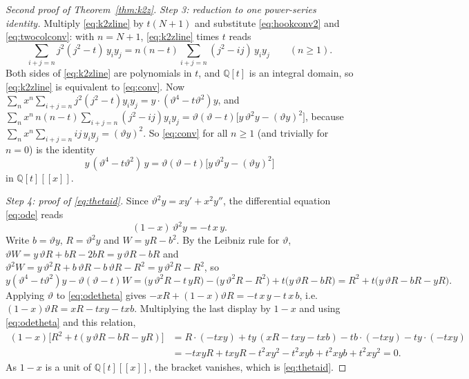 \documentclass[11pt]{article}
\theoremstyle{definition}
\theoremstyle{remark}
\begin{document}
\begin{proof}[Second proof of Theorem~\ref{thm:k2z}]
\emph{Step 3: reduction to one power-series identity.} Multiply \eqref{eq:k2zline} by $t(N+1)$ and substitute \eqref{eq:hookconv2} and \eqref{eq:twocolconv}: with $n=N+1$, \eqref{eq:k2zline} times $t$ reads
\begin{equation}\label{eq:conv}
\sum_{i+j=n}j^2(j^2-t)\,y_iy_j=n(n-t)\sum_{i+j=n}(j^2-ij)\,y_iy_j\qquad(n\ge1).
\end{equation}
Both sides of \eqref{eq:k2zline} are polynomials in $t$, and $\mathbb Q[t]$ is an integral domain, so \eqref{eq:k2zline} is equivalent to \eqref{eq:conv}. Now $\sum_nx^n\sum_{i+j=n}j^2(j^2-t)y_iy_j=y\cdot(\vartheta^4-t\vartheta^2)y$, and $\sum_nx^n\,n(n-t)\sum_{i+j=n}(j^2-ij)y_iy_j=\vartheta(\vartheta-t)\bigl[y\,\vartheta^2y-(\vartheta y)^2\bigr]$, because $\sum_nx^n\sum_{i+j=n}ij\,y_iy_j=(\vartheta y)^2$. So \eqref{eq:conv} for all $n\ge1$ (and trivially for $n=0$) is the identity
\begin{equation}\label{eq:thetaid}
y\,(\vartheta^4-t\vartheta^2)\,y=\vartheta(\vartheta-t)\bigl[y\,\vartheta^2y-(\vartheta y)^2\bigr]
\end{equation}
in $\mathbb Q[t][[x]]$.

\emph{Step 4: proof of \eqref{eq:thetaid}.} Since $\vartheta^2y=xy'+x^2y''$, the differential equation \eqref{eq:ode} reads
\begin{equation}\label{eq:odetheta}
(1-x)\,\vartheta^2y=-t\,x\,y .
\end{equation}
Write $b=\vartheta y$, $R=\vartheta^2y$ and $W=yR-b^2$. By the Leibniz rule for $\vartheta$, $\vartheta W=y\,\vartheta R+bR-2bR=y\,\vartheta R-bR$ and $\vartheta^2W=y\,\vartheta^2R+b\,\vartheta R-b\,\vartheta R-R^2=y\,\vartheta^2R-R^2$, so
\[
y(\vartheta^4-t\vartheta^2)y-\vartheta(\vartheta-t)W=\bigl(y\,\vartheta^2R-t\,yR\bigr)-\bigl(y\,\vartheta^2R-R^2\bigr)+t\bigl(y\,\vartheta R-bR\bigr)
=R^2+t\bigl(y\,\vartheta R-bR-yR\bigr).
\]
Applying $\vartheta$ to \eqref{eq:odetheta} gives $-xR+(1-x)\vartheta R=-t\,x\,y-t\,x\,b$, i.e.\ $(1-x)\vartheta R=xR-txy-txb$. Multiplying the last display by $1-x$ and using \eqref{eq:odetheta} and this relation,
\begin{align*}
(1-x)\bigl[R^2+t(y\,\vartheta R-bR-yR)\bigr]
&=R\cdot(-txy)+ty\,(xR-txy-txb)-tb\cdot(-txy)-ty\cdot(-txy)\\
&=-txyR+txyR-t^2xy^2-t^2xyb+t^2xyb+t^2xy^2=0 .
\end{align*}
As $1-x$ is a unit of $\mathbb Q[t][[x]]$, the bracket vanishes, which is \eqref{eq:thetaid}.
\end{proof}
\end{document}
